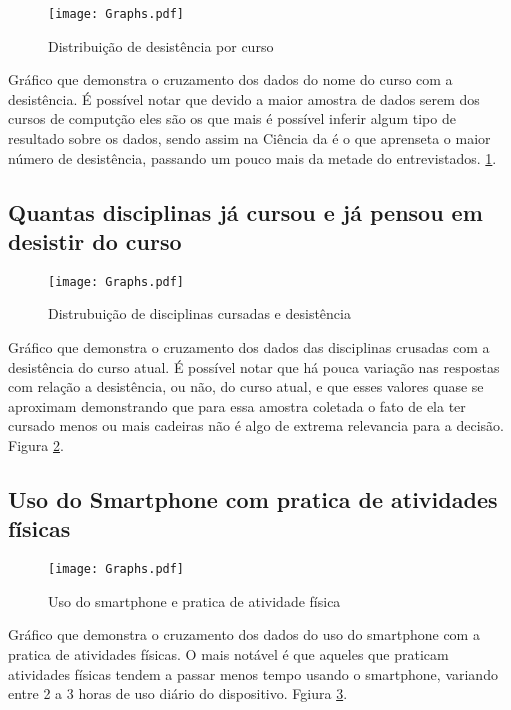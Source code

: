 \documentclass[11pt]{scrartcl} %
\begin{document}
\begin{figure}[h]
  \centering
  \texttt{[image: Graphs.pdf]}
  \label{fig:graph10}
  \caption{Distribuição de desistência por curso}
\end{figure}

Gráfico que demonstra o cruzamento dos dados do nome do curso com a desistência. É possível notar que devido a maior amostra de dados serem dos cursos de computção eles são os que mais é possível inferir algum tipo de resultado sobre os dados, sendo assim na Ciência da é o que aprenseta o maior número de desistência, passando um pouco mais da metade do entrevistados. \ref{fig:graph10}.

\subsection{Quantas disciplinas já cursou e já pensou em desistir do curso}

\begin{figure}[h]
  \centering
  \texttt{[image: Graphs.pdf]}
  \label{fig:graph11}
  \caption{Distrubuição de disciplinas cursadas e desistência}
\end{figure}

Gráfico que demonstra o cruzamento dos dados das disciplinas crusadas com a desistência do curso atual. É possível notar que há pouca variação nas respostas com relação a desistência, ou não, do curso atual, e que esses valores quase se aproximam demonstrando que para essa amostra coletada o fato de ela ter cursado menos ou mais cadeiras não é algo de extrema relevancia para a decisão. Figura \ref{fig:graph11}.

\subsection{Uso do Smartphone com pratica de atividades físicas}

\begin{figure}[h]
  \centering
  \texttt{[image: Graphs.pdf]}
  \label{fig:graph12}
  \caption{Uso do smartphone e pratica de atividade física}
\end{figure}

Gráfico que demonstra o cruzamento dos dados do uso do smartphone com a pratica de atividades físicas. O mais notável é que aqueles que praticam atividades físicas tendem a passar menos tempo usando o smartphone, variando entre 2 a 3 horas de uso diário do dispositivo. Fgiura \ref{fig:graph12}.
\end{document}
